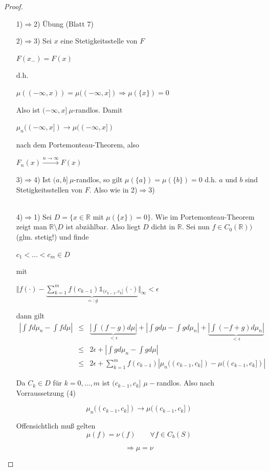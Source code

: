 \documentclass[10pt,a4paper]{report}
\newcommand{\R}{\mathbb{R}}
\numberwithin{equation}{section}
\numberwithin{figure}{section}
\theoremstyle{plain}
\theoremstyle{definition}
\theoremstyle{remark}
\theoremstyle{plain}
\newcommand{\1}{ \mathbb{1} } %
\begin{document}
\begin{proof} \ 
  \begin{itemize}
  \item[1)$\Rightarrow$2)] Übung (Blatt 7)
  \item[2)$\Rightarrow$3)] Sei $x$ eine Stetigkeitsstelle von $F$
    \begin{center}
      $F(x_-)=F(x)$
    \end{center}
    d.h.
    \begin{center}
      $\mu((-\infty,x))=\mu((-\infty,x]) \Rightarrow \mu(\{x\})=0$
    \end{center}
    Also ist $(-\infty,x]~\mu$-randlos. Damit
    \begin{center}
      $\mu_n((-\infty,x])\to\mu((-\infty,x])$
    \end{center}
    nach dem Portemonteau-Theorem, also
    \begin{center}
      $F_n(x) \overset{n \to \infty}{\to} F(x)$
    \end{center}
    \item[3)$\Rightarrow$4)] Ist $(a,b]~\mu$-randlos, so gilt $\mu(\{a\})=\mu(\{b\})=0$ d.h. $a$ und $b$ sind Stetigkeitsstellen von $F$. Also wie in 2)$\Rightarrow$3)\\\\
    \item[4)$\Rightarrow$1)] Sei $D=\{x \in \R $ mit $\mu(\{x\})=0\}$. Wie im
    Portemonteau-Theorem zeigt man $\R\setminus D$ ist abzählbar. Also
    liegt $D$ dicht in $\R$. Sei nun $f \in C_0(\R))$ (glm. stetig!)
    und finde
    \begin{center}
      $c_1<\ldots<c_m \in D$
    \end{center}
    mit
    \begin{center}
      $\Vert f(\cdot)-\underbrace{\sum\limits_{k=1}^m
        f(c_{k-1})\1_{(c_{k-1},c_k]}(\cdot)}_{=:g}\Vert_\infty <
      \epsilon$
    \end{center}
    dann gilt
    \begin{eqnarray*}
      \left|\int fd\mu_n-\int fd\mu\right|&\leq &\underbrace{\left|\int(f-g)d\mu\right|}_{<\epsilon}+\left|\int gd\mu-\int g d\mu_n\right|+\underbrace{\left|\int(-f+g)d\mu_n \right|}_{<\epsilon}\\
      &\leq & 2\epsilon + \left|\int g d\mu_n-\int gd\mu\right|\\
      &\leq & 2\epsilon + \sum\limits_{k=1}^m f(c_{k-1})|\mu_n((c_{k-1},c_k])-\mu((c_{k-1},c_k])|
    \end{eqnarray*}


Da $C_{k}\in D$ für $k=0,\ldots,m$ ist $(c_{k-1},c_{k}]$ $\mu-$randlos.
Also nach Vorraussetzung (4)

\[
\mu_{n}((c_{k-1},c_{k}])\to\mu((c_{k-1},c_{k}])
\]


Offensichtlich muß gelten
\[
\mu(f)=\nu(f)\qquad\forall f\in C_{b}(S)
\]

\[
\Rightarrow\mu=\nu
\]

  \end{itemize}
\end{proof}
\end{document}
